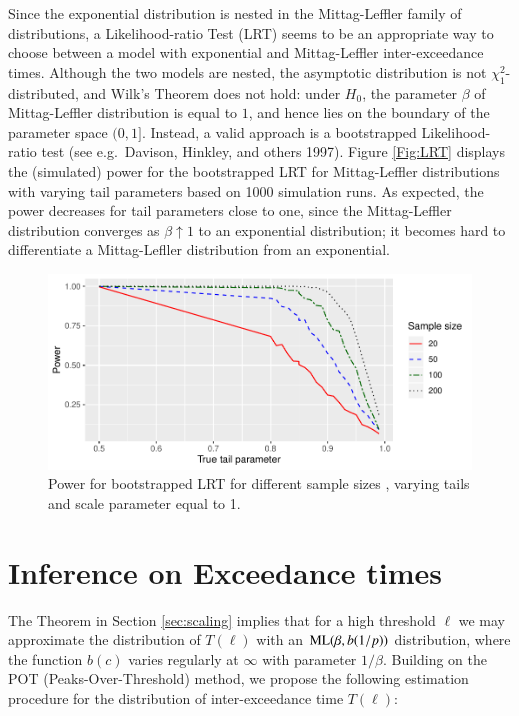 \documentclass[]{elsarticle} %
\begin{document}
Since the exponential distribution is nested in the Mittag-Leffler
family of distributions, a Likelihood-ratio Test (LRT) seems to be an
appropriate way to choose between a model with exponential and
Mittag-Leffler inter-exceedance times. Although the two models are
nested, the asymptotic distribution is not \(\chi^2_1\)-distributed, and
Wilk's Theorem does not hold: under \(H_0\), the parameter \(\beta\) of
Mittag-Leffler distribution is equal to \(1\), and hence lies on the
boundary of the parameter space \((0,1]\). Instead, a valid approach is
a bootstrapped Likelihood-ratio test (see e.g.~Davison, Hinkley, and
others 1997). Figure \ref{Fig:LRT} displays the (simulated) power for
the bootstrapped LRT for Mittag-Leffler distributions with varying tail
parameters based on 1000 simulation runs. As expected, the power
decreases for tail parameters close to one, since the Mittag-Leffler
distribution converges as \(\beta \uparrow 1\) to an exponential
distribution; it becomes hard to differentiate a Mittag-Lefller
distribution from an exponential.

\begin{figure}

{\centering \includegraphics[width=0.9\linewidth]{article_springer_files/figure-latex/LRT_power-1} 

}

\caption{\label{Fig:LRT} Power for bootstrapped LRT for different sample sizes , varying tails and scale parameter equal to 1.}\label{fig:LRT_power}
\end{figure}

\hypertarget{inference-on-exceedance-times}{%
\section{Inference on Exceedance
times}\label{inference-on-exceedance-times}}

The Theorem in Section \ref{sec:scaling} implies that for a high
threshold \(\ell\) we may approximate the distribution of \(T(\ell)\)
with an \({\rm ML}(\beta, b(1/p))\) distribution, where the function
\(b(c)\) varies regularly at \(\infty\) with parameter \(1/\beta\).
Building on the POT (Peaks-Over-Threshold) method, we propose the
following estimation procedure for the distribution of inter-exceedance
time \(T(\ell)\):
\end{document}
